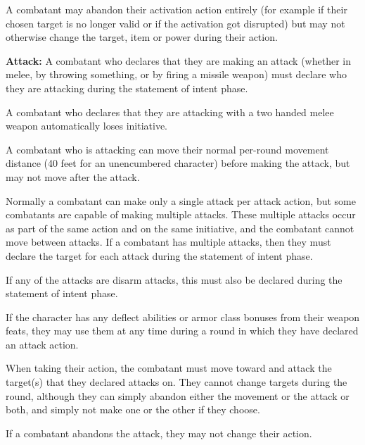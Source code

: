 \begin{multicols*}{2}
A combatant may abandon their activation action entirely (for example if their chosen target is no longer valid or if the activation got disrupted) but may not otherwise change the target, item or power during their action.

\textbf{Attack:}\label{sec:Attack} A combatant who declares that they are making an attack (whether in melee, by throwing something, or by firing a missile weapon) must declare who they are attacking during the statement of intent phase.

A combatant who declares that they are attacking with a two handed melee weapon automatically loses initiative.

A combatant who is attacking can move their normal per-round movement distance (40 feet for an unencumbered character) before making the attack, but may not move after the attack.

Normally a combatant can make only a single attack per attack action, but some combatants are capable of making multiple attacks. These multiple attacks occur as part of the same action and on the same initiative, and the combatant cannot move between attacks. If a combatant has multiple attacks, then they must declare the target for each attack during the statement of intent phase.

If any of the attacks are disarm attacks, this must also be declared during the statement of intent phase.

If the character has any deflect abilities or armor class bonuses from their weapon feats, they may use them at any time during a round in which they have declared an attack action.

When taking their action, the combatant must move toward and attack the target(s) that they declared attacks on. They cannot change targets during the round, although they can simply abandon either the movement or the attack or both, and simply not make one or the other if they choose.

If a combatant abandons the attack, they may not change their action.

\end{multicols*}
